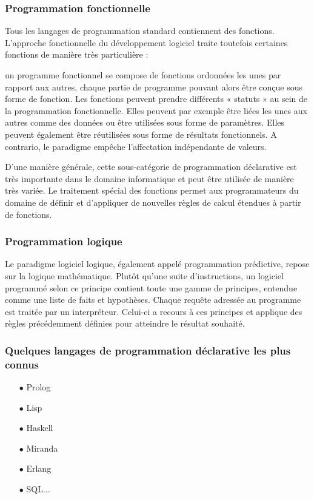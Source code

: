\documentclass[a4paper,12pt]{article} %
\begin{document}
\subsubsection{Programmation fonctionnelle}

Tous les langages de programmation standard contiennent des fonctions. L’approche fonctionnelle du développement logiciel traite toutefois certaines fonctions de manière très particulière :

un programme fonctionnel se compose de fonctions ordonnées les unes par rapport aux autres, chaque partie de programme pouvant alors être conçue sous forme de fonction. Les fonctions peuvent prendre différents « statuts » au sein de la programmation fonctionnelle. Elles peuvent par exemple être liées les unes aux autres comme des données ou être utilisées sous forme de paramètres. Elles peuvent également être réutilisées sous forme de résultats fonctionnels. A contrario, le paradigme empêche l’affectation indépendante de valeurs.

D’une manière générale, cette sous-catégorie de programmation déclarative est très importante dans le domaine informatique et peut être utilisée de manière très variée. Le traitement spécial des fonctions permet aux programmateurs du domaine de définir et d’appliquer de nouvelles règles de calcul étendues à partir de fonctions.

\subsubsection{Programmation logique}

Le paradigme logiciel logique, également appelé programmation prédictive, repose sur la logique mathématique. Plutôt qu’une suite d’instructions, un logiciel programmé selon ce principe contient toute une gamme de principes, entendue comme une liste de faits et hypothèses. Chaque requête adressée au programme est traitée par un interpréteur. Celui-ci a recours à ces principes et applique des règles précédemment définies pour atteindre le résultat souhaité.

\subsubsection{Quelques langages de programmation déclarative les plus connus }
\begin{itemize}
   \item[$\bullet$]Prolog
   \item[$\bullet$]Lisp
   \item[$\bullet$]Haskell
   \item[$\bullet$]Miranda
   \item[$\bullet$]Erlang
   \item[$\bullet$]SQL...
\end{itemize}
\end{document}
